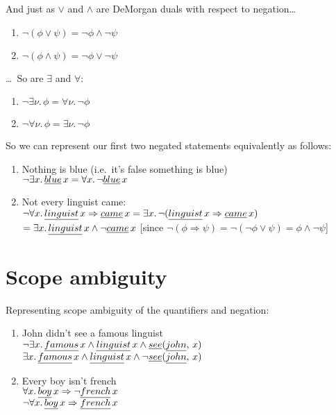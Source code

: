 \documentclass{article}
\newcommand{\Ra}{\Rightarrow}
\begin{document}
And just as $\vee$ and $\wedge$ are DeMorgan duals with respect to negation\dots
\begin{enumerate}
  \item
    $\neg(\phi \vee \psi) = \neg \phi \wedge \neg \psi$

  \item
    $\neg(\phi \wedge \psi) = \neg \phi \vee \neg \psi$
\end{enumerate}

\dots\ So are $\exists$ and $\forall$:
\begin{enumerate}
  \item
    $\neg\exists \nu.\,\phi = \forall \nu.\,\neg\phi$

  \item
    $\neg\forall \nu.\,\phi = \exists \nu.\,\neg\phi$    
\end{enumerate}

So we can represent our first two negated statements equivalently as follows:
\begin{enumerate}
  \item
    Nothing is blue (i.e.~it's false something is blue)
    \\
    $\neg\exists x.\, \emph{blue}\,x = \forall x.\,\neg\emph{blue}\,x$

  \item
    Not every linguist came:
    \\
    $\neg\forall x.\,\emph{linguist}\,x \Ra \emph{came}\,x = \exists
    x.\,\neg(\emph{linguist}\,x \Ra \emph{came}\,x)$
    \\
    $= \exists x.\, \emph{linguist}\,x \wedge \neg \emph{came}\,x$ \hfill [since
    $\neg(\phi \Ra \psi) = \neg(\neg\phi \vee \psi) = \phi \wedge \neg \psi$]
\end{enumerate}

\section{Scope ambiguity}

Representing scope ambiguity of the quantifiers and negation:
\begin{enumerate}
  \item
    John didn't see a famous linguist
    \\
    $\neg\exists x.\,\emph{famous}\, x \wedge \emph{linguist}\,x \wedge
    \emph{see} (\emph{john},\,x)$
    \\
    $\exists x.\,\emph{famous}\, x \wedge \emph{linguist}\,x \wedge \neg
    \emph{see} (\emph{john}, \,x)$
    
  \item
    Every boy isn't french
    \\
    $\forall x.\, \emph{boy}\,x \Ra \neg\emph{french}\,x$
    \\
    $\neg\forall x.\, \emph{boy}\,x \Ra \emph{french}\,x$
\end{enumerate}
\end{document}
